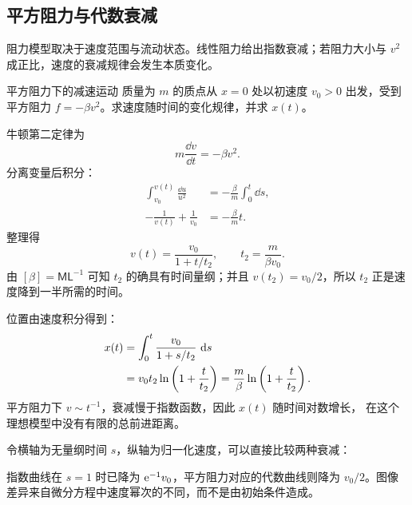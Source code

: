\documentclass[UTF8,zihao=-4,oneside,openany]{ctexbook}
\begin{document}
\subsection{平方阻力与代数衰减}

阻力模型取决于速度范围与流动状态。线性阻力给出指数衰减；若阻力大小与 $v^2$
成正比，速度的衰减规律会发生本质变化。

\begin{examplebox}{平方阻力下的减速运动}
质量为 $m$ 的质点从 $x=0$ 处以初速度 $v_0>0$ 出发，受到平方阻力
$f=-\beta v^2$。求速度随时间的变化规律，并求 $x(t)$。

\tcblower
牛顿第二定律为
\begin{equation}
  m\frac{\dd v}{\dd t}=-\beta v^2.
  \label{eq:quadratic-drag-ode}
\end{equation}
分离变量后积分：
\begin{align*}
  \int_{v_0}^{v(t)}\frac{\dd u}{u^2}
  &=-\frac{\beta}{m}\int_0^t\dd s,\\
  -\frac1{v(t)}+\frac1{v_0}
  &=-\frac{\beta}{m}t.
\end{align*}
整理得
\begin{equation}
  v(t)=\frac{v_0}{1+t/t_2},
  \qquad
  t_2=\frac{m}{\beta v_0}.
  \label{eq:quadratic-drag-velocity}
\end{equation}
由 $[\beta]=\mathsf M\mathsf L^{-1}$ 可知 $t_2$ 的确具有时间量纲；并且
$v(t_2)=v_0/2$，所以 $t_2$ 正是速度降到一半所需的时间。

位置由速度积分得到：
\begin{align}
  x(t)
  &=\int_0^t\frac{v_0}{1+s/t_2}\,\mathop{}\!\mathrm{d} s\notag\\
  &=v_0t_2\ln\left(1+\frac{t}{t_2}\right)
  =\frac{m}{\beta}\ln\left(1+\frac{t}{t_2}\right).
  \label{eq:quadratic-drag-position}
\end{align}
平方阻力下 $v\sim t^{-1}$，衰减慢于指数函数，因此 $x(t)$ 随时间对数增长，
在这个理想模型中没有有限的总前进距离。
\end{examplebox}

令横轴为无量纲时间 $s$，纵轴为归一化速度，可以直接比较两种衰减：
\begin{center}
\end{center}
指数曲线在 $s=1$ 时已降为 $\mathrm e^{-1}v_0$，平方阻力对应的代数曲线则降为
$v_0/2$。图像差异来自微分方程中速度幂次的不同，而不是由初始条件造成。
\end{document}
